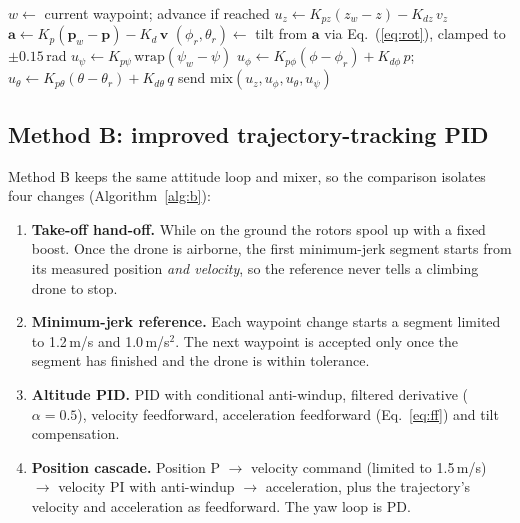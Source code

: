\begin{algorithm}[h]
\caption{Method A step (baseline)}
\label{alg:a}
\begin{algorithmic}[1]
\State $w \gets$ current waypoint; advance if reached
\State $u_z \gets K_{pz}(z_w - z) - K_{dz}\,v_z$ 
 
\State $\mathbf a \gets K_p(\mathbf p_w - \mathbf p) - K_d\,\mathbf v$ 
\State $(\phi_r, \theta_r) \gets$ tilt from $\mathbf a$ via Eq.~(\ref{eq:rot}), clamped to $\pm 0.15$\,rad
\State $u_\psi \gets K_{p\psi}\,\mathrm{wrap}(\psi_w - \psi)$
\EndIf
\State $u_\phi \gets K_{p\phi}(\phi - \phi_r) + K_{d\phi}\,p$; \quad $u_\theta \gets K_{p\theta}(\theta - \theta_r) + K_{d\theta}\,q$
\State send $\mathrm{mix}(u_z, u_\phi, u_\theta, u_\psi)$ 
\end{algorithmic}
\end{algorithm}

\subsection{Method B: improved trajectory-tracking PID}
Method B keeps the same attitude loop and mixer, so the comparison isolates four changes (Algorithm~\ref{alg:b}):
\begin{enumerate}[itemsep=0pt,topsep=2pt]
\item \textbf{Take-off hand-off.} While on the ground the rotors spool up with a fixed boost. Once the drone is airborne, the first minimum-jerk segment starts from its measured position \emph{and velocity}, so the reference never tells a climbing drone to stop.
\item \textbf{Minimum-jerk reference.} Each waypoint change starts a segment limited to 1.2\,m/s and 1.0\,m/s$^2$. The next waypoint is accepted only once the segment has finished and the drone is within tolerance.
\item \textbf{Altitude PID.} PID with conditional anti-windup, filtered derivative ($\alpha = 0.5$), velocity feedforward, acceleration feedforward (Eq.~\ref{eq:ff}) and tilt compensation.
\item \textbf{Position cascade.} Position P $\rightarrow$ velocity command (limited to 1.5\,m/s) $\rightarrow$ velocity PI with anti-windup $\rightarrow$ acceleration, plus the trajectory's velocity and acceleration as feedforward. The yaw loop is PD.
\end{enumerate}


